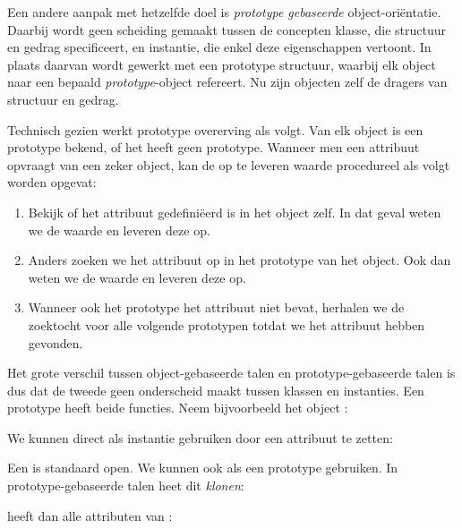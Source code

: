Een andere aanpak met hetzelfde doel is \emph{prototype gebaseerde} object-oriëntatie. Daarbij wordt geen scheiding gemaakt tussen de concepten klasse, die structuur en gedrag specificeert, en instantie, die enkel deze eigenschappen vertoont. In plaats daarvan wordt gewerkt met een prototype structuur, waarbij elk object naar een bepaald \emph{prototype}-object refereert. Nu zijn objecten zelf de dragers van structuur en gedrag.

Technisch gezien werkt prototype overerving als volgt. Van elk object is een prototype bekend, of het heeft geen prototype. Wanneer men een attribuut opvraagt van een zeker object, kan de op te leveren waarde procedureel als volgt worden opgevat:

\begin{enumerate}
  \item Bekijk of het attribuut gedefiniëerd is in het object zelf. In dat geval weten we de waarde en leveren deze op.
  \item Anders zoeken we het attribuut op in het prototype van het object. Ook dan weten we de waarde en leveren deze op.
  \item Wanneer ook het prototype het attribuut niet bevat, herhalen we de zoektocht voor alle volgende prototypen totdat we het attribuut hebben gevonden.
\end{enumerate}

Het grote verschil tussen object-gebaseerde talen en prototype-gebaseerde talen is dus dat de tweede geen onderscheid maakt tussen klassen en instanties. Een prototype heeft beide functies. Neem bijvoorbeeld het object :

\newCodeFragment


We kunnen  direct als instantie gebruiken door een attribuut te zetten:


Een  is standaard open. We kunnen  ook als een prototype gebruiken. In prototype-gebaseerde talen heet dit \emph{klonen}:


 heeft dan alle attributen van :

